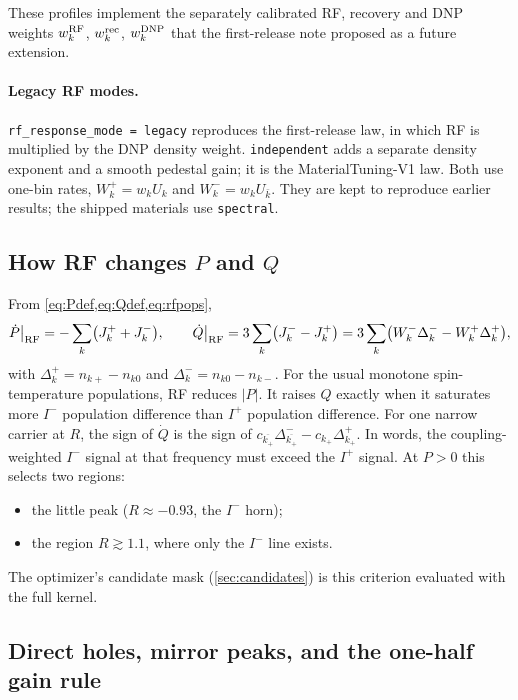 \documentclass[11pt]{article}
\newcommand{\Iplus}{I^{+}}
\newcommand{\Iminus}{I^{-}}
\newcommand{\kb}{\bar{k}}
\newcommand{\code}[1]{\texttt{#1}}
\begin{document}
These profiles implement the separately calibrated RF, recovery and DNP weights
\(w^{\rm RF}_k\), \(w^{\rm rec}_k\), \(w^{\rm DNP}_k\) that the first-release note proposed as a
future extension.

\paragraph{Legacy RF modes.} \code{rf\_response\_mode = legacy} reproduces the first-release law,
in which RF is multiplied by the DNP density weight. \code{independent} adds a separate density
exponent and a smooth pedestal gain; it is the MaterialTuning-V1 law. Both use one-bin rates,
\(W^+_k=w_kU_k\) and \(W^-_k=w_kU_{\kb}\). They are kept to reproduce earlier results; the
shipped materials use \code{spectral}.

\subsection{How RF changes \texorpdfstring{\(P\)}{P} and \texorpdfstring{\(Q\)}{Q}}
\label{sec:rf-PQ}

From \cref{eq:Pdef,eq:Qdef,eq:rfpops},
\begin{equation}
\dot P\big|_{\rm RF} = -\sum_k\bigl(J^+_k+J^-_k\bigr),\qquad
\dot Q\big|_{\rm RF} = 3\sum_k\bigl(J^-_k-J^+_k\bigr)=3\sum_k\bigl(W^-_k\Delta^-_k-W^+_k\Delta^+_k\bigr),
\label{eq:dQrf}
\end{equation}
with \(\Delta^+_k=n_{k+}-n_{k0}\) and \(\Delta^-_k=n_{k0}-n_{k-}\). For the usual monotone
spin-temperature populations, RF reduces \(|P|\). It raises \(Q\) exactly when it saturates more
\(\Iminus\) population difference than \(\Iplus\) population difference. For one narrow carrier
at \(R\), the sign of \(\dot Q\) is the sign of
\(c_{\overline{k_+}}\Delta^-_{\overline{k_+}}-c_{k_+}\Delta^+_{k_+}\). In words, the
coupling-weighted \(\Iminus\) signal at that frequency must exceed the \(\Iplus\) signal. At
\(P>0\) this selects two regions:
\begin{itemize}
\item the little peak (\(R\approx-0.93\), the \(\Iminus\) horn);
\item the region \(R\gtrsim1.1\), where only the \(\Iminus\) line exists.
\end{itemize}
The optimizer's candidate mask (\cref{sec:candidates}) is this criterion evaluated with the full
kernel.

\subsection{Direct holes, mirror peaks, and the one-half gain rule}
\label{sec:mirror}
\end{document}
